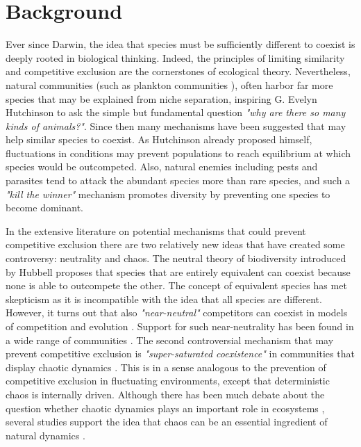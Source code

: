 \section{Background}
\label{sec:Background}
Ever since Darwin, the idea that species must be sufficiently different to coexist is deeply rooted in biological thinking. Indeed, the principles of limiting similarity \citep{MacArthur} and competitive exclusion \citep{Hardin1960} are the cornerstones of ecological theory. Nevertheless, natural communities (such as plankton communities \citep{Hutchinson1961}), often harbor far more species that may be explained from niche separation, inspiring G. Evelyn Hutchinson \citeyearpar{Hutchinson} to ask the simple but fundamental question \textit{"why are there so many kinds of animals?"}. Since then many mechanisms have been suggested that may help similar species to coexist. As Hutchinson \citeyearpar{Hutchinson1961} already proposed himself, fluctuations in conditions may prevent populations to reach equilibrium at which species would be outcompeted. Also, natural enemies including pests and parasites tend to attack the abundant species more than rare species, and such a \textit{"kill the winner"} \citep{Winter2010} mechanism promotes diversity by preventing one species to become dominant.

In the extensive literature on potential mechanisms that could prevent competitive exclusion there are two relatively new ideas that have created some controversy: neutrality and chaos. The neutral theory of biodiversity introduced by Hubbell \citeyearpar{Hubbell2001} proposes that species that are entirely equivalent can coexist because none is able to outcompete the other. The concept of equivalent species has met skepticism as it is incompatible with the idea that all species are different. However, it turns out that also \textit{"near-neutral"} competitors can coexist in models of competition and evolution \citep{Scheffer2006, Scheffer2018}. Support for such near-neutrality has been found in a wide range of communities \citep{Vergnon2013, Segura2013}. The second controversial mechanism that may prevent competitive exclusion is \textit{"super-saturated coexistence"} in communities that display chaotic dynamics \citep{Huisman1999}. This is in a sense analogous to the prevention of competitive exclusion in fluctuating environments, except that deterministic chaos is internally driven. Although there has been much debate about the question whether chaotic dynamics plays an important role in ecosystems \citep{Berryman1989, Scheffer1991, Schippers2001}, several studies support the idea that chaos can be an essential ingredient of natural dynamics \citep{Huisman1999, Beninca2008, Beninca}.

